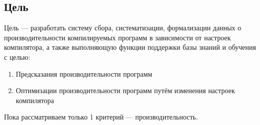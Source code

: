\subsection{Цель}
Цель — разработать систему сбора, систематизации, формализации данных о производительности компилируемых программ в зависимости от настроек компилятора, а также выполняющую функции поддержки базы знаний и обучения с целью:
\begin{enumerate}
\item Предсказания производительности программ
\item Оптимизации производительности программ путём изменения настроек компилятора
\end{enumerate}

Пока рассматриваем только 1 критерий --- производительность.

